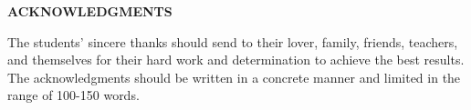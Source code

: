 \documentclass[../main.tex]{subfiles}
\begin{document}
\begin{center}
    \Large{\textbf{ACKNOWLEDGMENTS}}\\
\end{center}
\vspace{1cm}
The students' sincere thanks should send to their lover, family, friends, teachers, and themselves for their hard work and determination to achieve the best results.  The acknowledgments should be written in a concrete manner and limited in the range of 100-150 words. 
\end{document}
